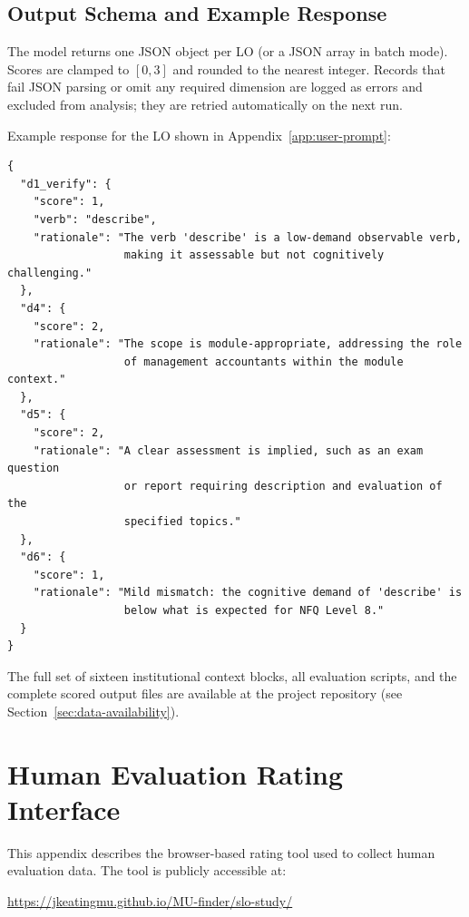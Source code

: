 \documentclass[12pt, a4paper]{article}
\begin{document}
\subsection{Output Schema and Example Response}
\label{app:output-schema}

The model returns one JSON object per LO (or a JSON array in batch mode). Scores
are clamped to $[0,3]$ and rounded to the nearest integer. Records that fail
JSON parsing or omit any required dimension are logged as errors and excluded
from analysis; they are retried automatically on the next run.

Example response for the LO shown in Appendix~\ref{app:user-prompt}:

\begin{small}
\begin{verbatim}
{
  "d1_verify": {
    "score": 1,
    "verb": "describe",
    "rationale": "The verb 'describe' is a low-demand observable verb,
                  making it assessable but not cognitively challenging."
  },
  "d4": {
    "score": 2,
    "rationale": "The scope is module-appropriate, addressing the role
                  of management accountants within the module context."
  },
  "d5": {
    "score": 2,
    "rationale": "A clear assessment is implied, such as an exam question
                  or report requiring description and evaluation of the
                  specified topics."
  },
  "d6": {
    "score": 1,
    "rationale": "Mild mismatch: the cognitive demand of 'describe' is
                  below what is expected for NFQ Level 8."
  }
}
\end{verbatim}
\end{small}

\noindent
The full set of sixteen institutional context blocks, all evaluation scripts,
and the complete scored output files are available at the project repository
(see Section~\ref{sec:data-availability}).

\section{Human Evaluation Rating Interface}
\label{app:rating-tool}

This appendix describes the browser-based rating tool used to collect human
evaluation data. The tool is publicly accessible at:

\begin{center}
\url{https://jkeatingmu.github.io/MU-finder/slo-study/}
\end{center}
\end{document}
